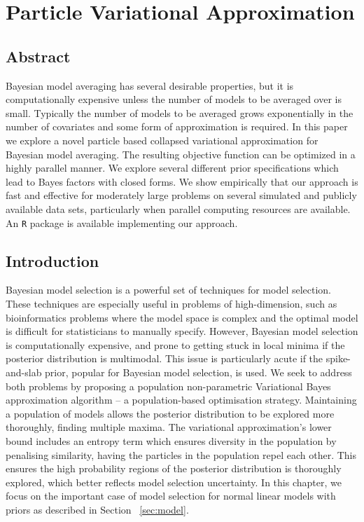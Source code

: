 \chapter{Particle Variational Approximation}


\section*{Abstract}

Bayesian model averaging  has several desirable properties, but it is
computationally expensive unless the number of models to be averaged  over is
small. Typically the number of models to be averaged grows exponentially in the
number of covariates and some form of approximation is required.  In this paper
we explore a novel particle based  collapsed variational approximation for
Bayesian model averaging.  The resulting objective function can be optimized in
a highly parallel manner.  We explore several different prior specifications
which lead to Bayes factors with closed forms.  We show empirically that our
approach is fast and effective for moderately large problems  on several
simulated and publicly available data sets, particularly when parallel computing
resources are available. An {\tt R} package is available implementing our
approach.

\newpage 

\section{Introduction}

Bayesian model selection is a powerful set of techniques for model selection.
These techniques are especially useful in problems of high-dimension, such as
bioinformatics problems where the model space is complex and the optimal model
is difficult for statisticians to manually specify. However, Bayesian model
selection is computationally expensive, and prone to getting stuck in local
minima if the posterior distribution is multimodal. This issue is particularly
acute if the spike-and-slab prior, popular for Bayesian model selection, is
used. We seek to address both problems by proposing a population
non-parametric Variational Bayes approximation algorithm -- a population-based
optimisation strategy. Maintaining a population of models allows the posterior
distribution to be explored more thoroughly, finding multiple maxima. The
variational approximation's lower bound includes an entropy term which ensures
diversity in the population by penalising similarity, having the particles in
the population repel each other. This ensures the high probability regions of
the posterior distribution is thoroughly explored, which better reflects model
selection uncertainty. In this chapter, we focus on the important case of
model selection for normal linear models with priors as described in Section
~\ref{sec:model}.

